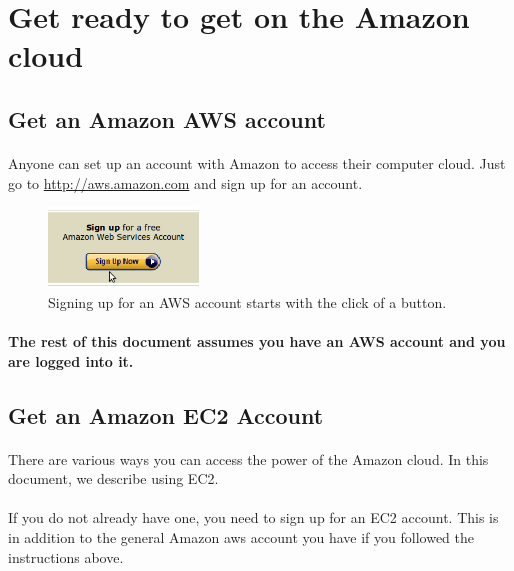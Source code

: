 \section{Get ready to get on the Amazon cloud}

\subsection{Get an Amazon AWS account}

\paragraph{}Anyone can set up an account with Amazon to access their computer cloud. Just go to \href{http://aws.amazon.com}{http://aws.amazon.com} and sign up for an account.

\begin{figure}
\includegraphics[width=40mm]{"images/aws_signup_button"}
\caption[Sign up for AWS]{\label{fig:aws_signup}Signing up for an AWS account starts with the click of a button.}
\end{figure}

\paragraph{The rest of this document assumes you have an AWS account and you are logged into it.}

\subsection{Get an Amazon EC2 Account}

\paragraph{}There are various ways you can access the power of the Amazon cloud. In this document, we describe using EC2. 

\paragraph{}If you do not already have one, you need to sign up for an EC2 account. This is in addition to the general Amazon aws account you have if you followed the instructions above. 

